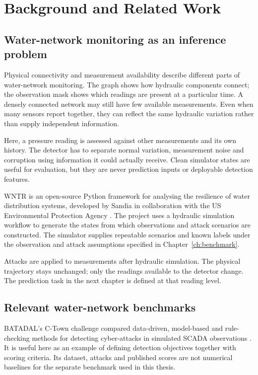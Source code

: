 \chapter{Background and Related Work}
\label{ch:background}

\section{Water-network monitoring as an inference problem}
Physical connectivity and measurement availability describe different parts of water-network monitoring. The graph shows how hydraulic components connect; the observation mask shows which readings are present at a particular time. A densely connected network may still have few available measurements. Even when many sensors report together, they can reflect the same hydraulic variation rather than supply independent information.

Here, a pressure reading is assessed against other measurements and its own history. The detector has to separate normal variation, measurement noise and corruption using information it could actually receive. Clean simulator states are useful for evaluation, but they are never prediction inputs or deployable detection features.

WNTR is an open-source Python framework for analysing the resilience of water distribution systems, developed by Sandia in collaboration with the US Environmental Protection Agency \cite{wntr}. The project uses a hydraulic simulation workflow to generate the states from which observations and attack scenarios are constructed. The simulator supplies repeatable scenarios and known labels under the observation and attack assumptions specified in Chapter~\ref{ch:benchmark}.

Attacks are applied to measurements after hydraulic simulation. The physical trajectory stays unchanged; only the readings available to the detector change. The prediction task in the next chapter is defined at that reading level.

\section{Relevant water-network benchmarks}
BATADAL's C-Town challenge compared data-driven, model-based and rule-checking methods for detecting cyber-attacks in simulated SCADA observations \cite{batadal}. It is useful here as an example of defining detection objectives together with scoring criteria. Its dataset, attacks and published scores are not numerical baselines for the separate benchmark used in this thesis.

